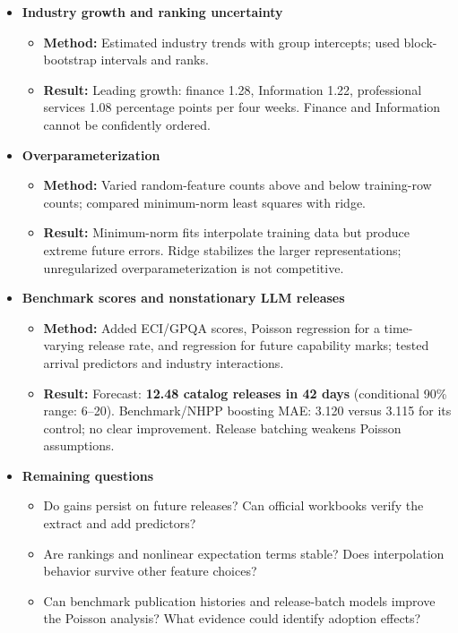\documentclass[10pt]{article}
\begin{document}
\begin{itemize}
\begin{itemize}
  \item \textbf{Result:} MAE: elastic net \textbf{3.07}, boosting \textbf{3.12}, ridge \textbf{3.13}, full OLS \textbf{5.68}. Removing history worsened ridge to 3.70; cycle terms added little.
  \end{itemize}
\item \textbf{Industry growth and ranking uncertainty}
  \begin{itemize}\setlength{\itemsep}{0pt}
  \item \textbf{Method:} Estimated industry trends with group intercepts; used block-bootstrap intervals and ranks.
  \item \textbf{Result:} Leading growth: finance 1.28, Information 1.22, professional services 1.08 percentage points per four weeks. Finance and Information cannot be confidently ordered.
  \end{itemize}
\item \textbf{Overparameterization}
  \begin{itemize}\setlength{\itemsep}{0pt}
  \item \textbf{Method:} Varied random-feature counts above and below training-row counts; compared minimum-norm least squares with ridge.
  \item \textbf{Result:} Minimum-norm fits interpolate training data but produce extreme future errors. Ridge stabilizes the larger representations; unregularized overparameterization is not competitive.
  \end{itemize}
\item \textbf{Benchmark scores and nonstationary LLM releases}
  \begin{itemize}\setlength{\itemsep}{0pt}
  \item \textbf{Method:} Added ECI/GPQA scores, Poisson regression for a time-varying release rate, and regression for future capability marks; tested arrival predictors and industry interactions.
  \item \textbf{Result:} Forecast: \textbf{12.48 catalog releases in 42 days} (conditional 90\% range: 6--20). Benchmark/NHPP boosting MAE: 3.120 versus 3.115 for its control; no clear improvement. Release batching weakens Poisson assumptions.
  \end{itemize}
\item \textbf{Remaining questions}
  \begin{itemize}\setlength{\itemsep}{0pt}
  \item Do gains persist on future releases? Can official workbooks verify the extract and add predictors?
  \item Are rankings and nonlinear expectation terms stable? Does interpolation behavior survive other feature choices?
  \item Can benchmark publication histories and release-batch models improve the Poisson analysis? What evidence could identify adoption effects?
  \end{itemize}
\end{itemize}
\end{document}
